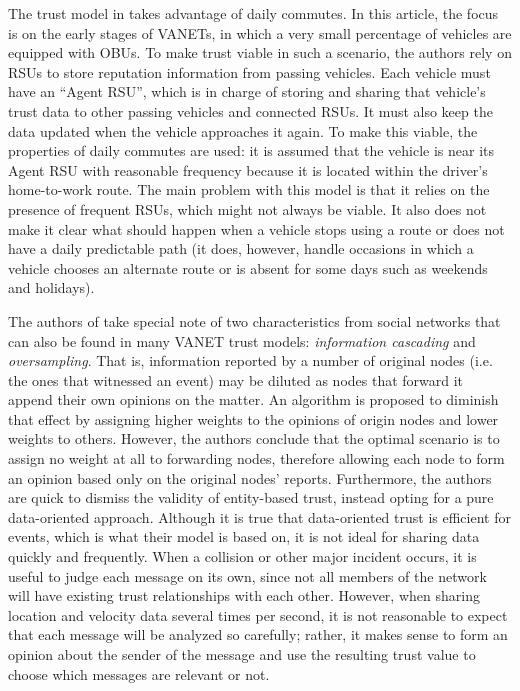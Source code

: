 The trust model in \citep{park2011long} takes advantage of daily commutes.
In this article, the focus is on the early stages of VANETs, in which a very small percentage of vehicles are equipped with OBUs.
To make trust viable in such a scenario, the authors rely on RSUs to store reputation information from passing vehicles.
Each vehicle must have an ``Agent RSU'', which is in charge of storing and sharing that vehicle's trust data to other passing vehicles and connected RSUs.
It must also keep the data updated when the vehicle approaches it again.
To make this viable, the properties of daily commutes are used: it is assumed that the vehicle is near its Agent RSU with reasonable frequency because it is located within the driver's home-to-work route.
The main problem with this model is that it relies on the presence of frequent RSUs, which might not always be viable.
It also does not make it clear what should happen when a vehicle stops using a route or does not have a daily predictable path (it does, however, handle occasions in which a vehicle chooses an alternate route or is absent for some days such as weekends and holidays).

The authors of \citep{huang2014social} take special note of two characteristics from social networks that can also be found in many VANET trust models: \textit{information cascading} and \textit{oversampling}.
That is, information reported by a number of original nodes (i.e. the ones that witnessed an event) may be diluted as nodes that forward it append their own opinions on the matter.
An algorithm is proposed to diminish that effect by assigning higher weights to the opinions of origin nodes and lower weights  to others.
However, the authors conclude that the optimal scenario is to assign no weight at all to forwarding nodes, therefore allowing each node to form an opinion based only on the original nodes' reports.
Furthermore, the authors are quick to dismiss the validity of entity-based trust, instead opting for a pure data-oriented approach.
Although it is true that data-oriented trust is efficient for events, which is what their model is based on, it is not ideal for sharing data quickly and frequently.
When a collision or other major incident occurs, it is useful to judge each message on its own, since not all members of the network will have existing trust relationships with each other.
However, when sharing location and velocity data several times per second, it is not reasonable to expect that each message will be analyzed so carefully; rather, it makes sense to form an opinion about the sender of the message and use the resulting trust value to choose which messages are relevant or not.

